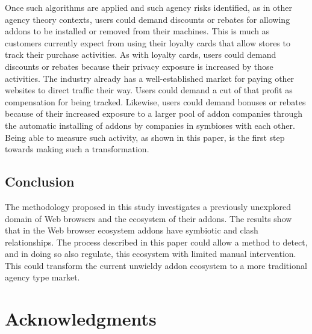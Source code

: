 \documentclass[10pt,letterpaper]{article}
\begin{document}
Once such algorithms are applied and such agency risks identified, as in other agency theory contexts, users could demand discounts or rebates for allowing addons to be installed or removed from their machines. This is much as customers currently expect from using their loyalty cards that allow stores to track their purchase activities. As with loyalty cards, users could demand discounts or rebates because their privacy exposure is increased by those activities. The industry already has a well-established market for paying other websites to direct traffic their way. Users could demand a cut of that profit as compensation for being tracked. Likewise, users could demand bonuses or rebates because of their increased exposure to a larger pool of addon companies through the automatic installing of addons by companies in symbioses with each other. Being able to measure such activity, as shown in this paper, is the first step towards making such a transformation. 



\subsection*{Conclusion}

The methodology proposed in this study investigates a previously unexplored domain of Web browsers and the ecosystem of their addons. The results show that in the Web browser ecosystem addons have symbiotic and clash relationships. The process described in this paper could allow a method to detect, and in doing so also regulate, this ecosystem with limited manual intervention. This could transform the current unwieldy addon ecosystem to a more traditional agency type market. 

\section*{Acknowledgments}

\nolinenumbers



\end{document}

